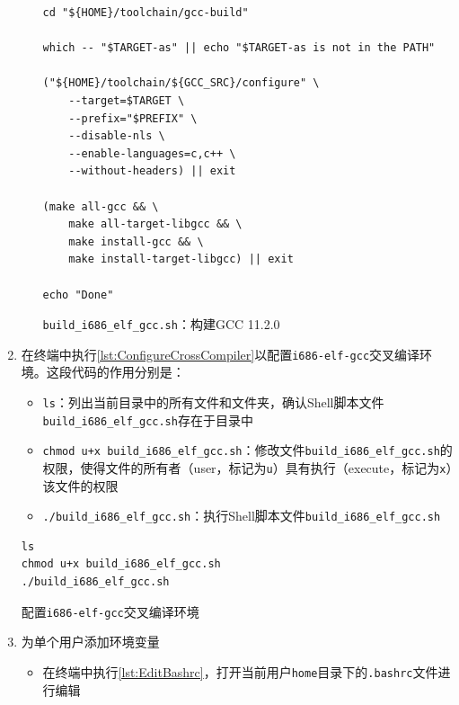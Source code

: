\begin{enumerate}
\begin{itemize}
\begin{listing}[htbp]
\begin{verbatim}
cd "${HOME}/toolchain/gcc-build"

which -- "$TARGET-as" || echo "$TARGET-as is not in the PATH"

("${HOME}/toolchain/${GCC_SRC}/configure" \
    --target=$TARGET \
    --prefix="$PREFIX" \
    --disable-nls \
    --enable-languages=c,c++ \
    --without-headers) || exit

(make all-gcc && \
    make all-target-libgcc && \
    make install-gcc && \
    make install-target-libgcc) || exit

echo "Done"
                    \end{verbatim}
                        \caption{\texttt{build\_i686\_elf\_gcc.sh}：构建GCC 11.2.0}\label{lst:BuildGCC}
                    \end{listing}
          \end{itemize}
    \item 在终端中执行\cref{lst:ConfigureCrossCompiler}以配置\texttt{i686-elf-gcc}交叉编译环境。这段代码的作用分别是：
          \begin{itemize}
              \item \texttt{ls}：列出当前目录中的所有文件和文件夹，确认Shell脚本文件\texttt{build\_i686\_elf\_gcc.sh}存在于目录中
              \item \texttt{chmod u+x build\_i686\_elf\_gcc.sh}：修改文件\texttt{build\_i686\_elf\_gcc.sh}的权限，使得文件的所有者（user，标记为\texttt{u}）具有执行（execute，标记为\texttt{x}）该文件的权限
              \item \texttt{./build\_i686\_elf\_gcc.sh}：执行Shell脚本文件\texttt{build\_i686\_elf\_gcc.sh}
          \end{itemize}
          \begin{listing}[htbp]
              \begin{verbatim}
ls
chmod u+x build_i686_elf_gcc.sh
./build_i686_elf_gcc.sh
          \end{verbatim}
              \caption{配置\texttt{i686-elf-gcc}交叉编译环境}\label{lst:ConfigureCrossCompiler}
          \end{listing}
    \item 为单个用户添加环境变量
          \begin{itemize}
              \item 在终端中执行\cref{lst:EditBashrc}，打开当前用户\texttt{home}目录下的\texttt{.bashrc}文件进行编辑
                    \begin{listing}[htbp]
                        \begin{verbatim}

\end{verbatim}
\end{listing}
\end{itemize}
\end{enumerate}
